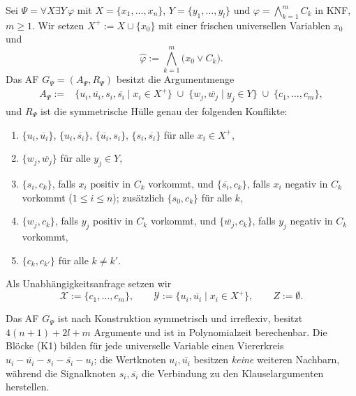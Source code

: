 \begin{Definition}
    \label{def:sym-konstruktion}
    Sei \(\Psi=\forall X\exists Y\,\varphi\) mit
    \(X=\{x_1,\dots,x_n\}\), \(Y=\{y_1,\dots,y_l\}\) und
    \(\varphi=\bigwedge_{k=1}^{m}C_k\) in KNF, \(m\geq 1\). Wir setzen
    \(X^{+}:=X\cup\{x_0\}\) mit einer frischen universellen Variablen \(x_0\)
    und
    \[
        \widehat{\varphi}:=\bigwedge_{k=1}^{m}\bigl(x_0\lor C_k\bigr).
    \]
    Das AF \(G_\Psi=(A_\Psi,R_\Psi)\) besitzt die Argumentmenge
    \[
    \begin{aligned}
        A_\Psi:={}&
        \{u_i,\overline{u_i},s_i,\overline{s_i}\mid x_i\in X^{+}\}
        \;\cup\;
        \{w_j,\overline{w_j}\mid y_j\in Y\}
        \;\cup\;
        \{c_1,\dots,c_m\},
    \end{aligned}
    \]
    und \(R_\Psi\) ist die symmetrische Hülle genau der folgenden Konflikte:
    \begin{enumerate}
        \item[(K1)] \(\{u_i,\overline{u_i}\}\),
        \(\{u_i,\overline{s_i}\}\),
        \(\{\overline{u_i},s_i\}\),
        \(\{s_i,\overline{s_i}\}\)
        \quad für alle \(x_i\in X^{+}\),
        \item[(K2)] \(\{w_j,\overline{w_j}\}\) \quad für alle \(y_j\in Y\),
        \item[(K3)] \(\{s_i,c_k\}\), falls \(x_i\) positiv in \(C_k\) vorkommt,
        und \(\{\overline{s_i},c_k\}\), falls \(x_i\) negativ in \(C_k\)
        vorkommt \quad(\(1\leq i\leq n\)); zusätzlich \(\{s_0,c_k\}\) für alle
        \(k\),
        \item[(K4)] \(\{w_j,c_k\}\), falls \(y_j\) positiv in \(C_k\) vorkommt,
        und \(\{\overline{w_j},c_k\}\), falls \(y_j\) negativ in \(C_k\)
        vorkommt,
        \item[(K5)] \(\{c_k,c_{k'}\}\) für alle \(k\neq k'\).
    \end{enumerate}
    Als Unabhängigkeitsanfrage setzen wir
    \[
        \mathcal{X}:=\{c_1,\dots,c_m\},\qquad
        \mathcal{Y}:=\{u_i,\overline{u_i}\mid x_i\in X^{+}\},\qquad
        Z:=\emptyset.
    \]
\end{Definition}

Das AF \(G_\Psi\) ist nach Konstruktion symmetrisch und irreflexiv, besitzt
\(4(n+1)+2l+m\) Argumente und ist in Polynomialzeit berechenbar. Die Blöcke
(K1) bilden für jede universelle Variable einen Viererkreis
\(u_i-\overline{u_i}-s_i-\overline{s_i}-u_i\); die Wertknoten
\(u_i,\overline{u_i}\) besitzen \emph{keine} weiteren Nachbarn, während die
Signalknoten \(s_i,\overline{s_i}\) die Verbindung zu den Klauselargumenten
herstellen.

